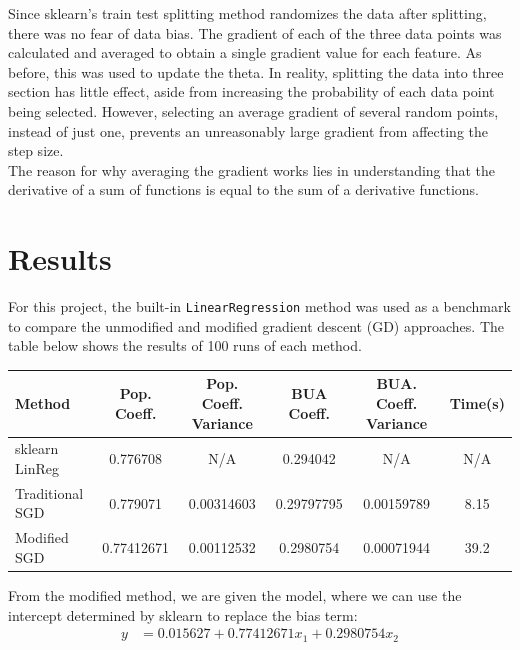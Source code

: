 \documentclass[onecolumn]{article}
\newcommand{\cc}[1]{\texttt{#1}}
\begin{document}
Since sklearn's train test splitting method randomizes the data after splitting, there was no fear of data bias. The gradient of each of the three data points was calculated and averaged to obtain a single gradient value for each feature. As before, this was used to update the theta. In reality, splitting the data into three section has little effect, aside from increasing the probability of each data point being selected. However, selecting an average gradient of several random points, instead of just one, prevents an unreasonably large gradient from affecting the step size. \\

The reason for why averaging the gradient works lies in understanding that the derivative of a sum of functions is equal to the sum of a derivative functions.

\section{Results}

For this project, the built-in \cc{LinearRegression} method was used as a benchmark to compare the unmodified and modified gradient descent (GD) approaches. The table below shows the results of 100 runs of each method.\\

\begingroup
    \medskip
    \centering
    \def\arraystretch{1.5}
        \begin{tabular}{lccccc}
            \toprule
            Method & Pop. Coeff. & Pop. Coeff. Variance & BUA Coeff. & BUA. Coeff. Variance & Time(s)\\
            \midrule
            sklearn LinReg & 0.776708 & N/A & 0.294042 & N/A & N/A\\
            Traditional SGD          & 0.779071 & 0.00314603 & 0.29797795 & 0.00159789 & 8.15\\
            Modified SGD             & 0.77412671 & 0.00112532 & 0.2980754 & 0.00071944 & 39.2\\
            \bottomrule
        \end{tabular}
    \label{fig:c2table1}
    \medskip
\endgroup

From the modified method, we are given the model, where we can use the intercept determined by sklearn to replace the bias term:\\

\begin{equation}
    \begin{split}
        y & = 0.015627 + 0.77412671x_{1} + 0.2980754x_{2}\\
    \end{split}
    \label{eq:turns}
\end{equation}
\end{document}
